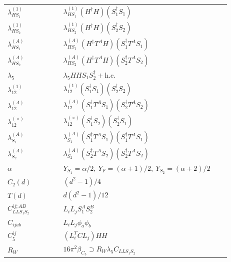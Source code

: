 \documentclass[10pt,a4paper]{article}
\begin{document}
\begin{longtable}{@{}p{0.23\linewidth}p{0.69\linewidth}@{}}
$\lambda_{HS_1}^{(1)}$ & $\lambda_{HS_1}^{(1)}(H^\dagger H)(S_1^\dagger S_1)$ \\
$\lambda_{HS_2}^{(1)}$ & $\lambda_{HS_2}^{(1)}(H^\dagger H)(S_2^\dagger S_2)$ \\
$\lambda_{HS_1}^{(A)}$ & $\lambda_{HS_1}^{(A)}(H^\dagger T^AH)(S_1^\dagger T^AS_1)$ \\
$\lambda_{HS_2}^{(A)}$ & $\lambda_{HS_2}^{(A)}(H^\dagger T^AH)(S_2^\dagger T^AS_2)$ \\
$\lambda_5$ & $\lambda_5HHS_1S_2^\dagger+\mathrm{h.c.}$ \\
$\lambda_{12}^{(1)}$ & $\lambda_{12}^{(1)}(S_1^\dagger S_1)(S_2^\dagger S_2)$ \\
$\lambda_{12}^{(A)}$ & $\lambda_{12}^{(A)}(S_1^\dagger T^AS_1)(S_2^\dagger T^AS_2)$ \\
$\lambda_{12}^{(\times)}$ & $\lambda_{12}^{(\times)}(S_1^\dagger S_2)(S_2^\dagger S_1)$ \\
$\lambda_{S_1}^{(A)}$ & $\lambda_{S_1}^{(A)}(S_1^\dagger T^A S_1)(S_1^\dagger T^A S_1)$ \\
$\lambda_{S_2}^{(A)}$ & $\lambda_{S_2}^{(A)}(S_2^\dagger T^A S_2)(S_2^\dagger T^A S_2)$ \\
$\alpha$ & $Y_{S_1}=\alpha/2,\ Y_F=(\alpha+1)/2,\ Y_{S_2}=(\alpha+2)/2$ \\
$C_2(d)$ & $(d^2-1)/4$ \\
$T(d)$ & $d(d^2-1)/12$ \\
$C_{LLS_1S_2}^{ij;AB}$ & $L_iL_jS_1^AS_2^B$ \\
$C_{ijab}$ & $L_iL_j\phi_a\phi_b$ \\
$C_5^{ij}$ & $(L_i^TCL_j)HH$ \\
$R_W$ & $16\pi^2\beta_{C_5}\supset R_W\lambda_5C_{LLS_1S_2}$ \\
\bottomrule
\end{longtable}
\end{document}
